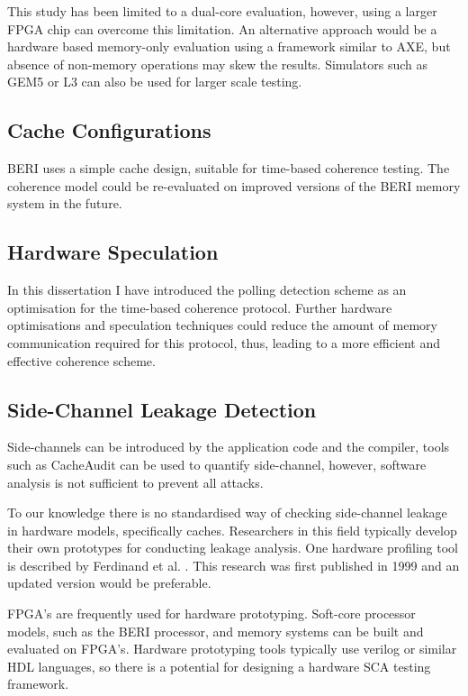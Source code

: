 			This study has been limited to a dual-core evaluation, however, using a larger FPGA chip can overcome this limitation.
			An alternative approach would be a hardware based memory-only evaluation using a framework similar to AXE, but absence of non-memory operations may skew the results.
			Simulators such as GEM5 \cite{GEM5} or L3 \cite{Fox15} can also be used for larger scale testing.
		
		\subsection{Cache Configurations}
			BERI uses a simple cache design, suitable for time-based coherence testing. The coherence model could be re-evaluated on improved versions of the BERI memory system in the future.
			
		\subsection{Hardware Speculation}
			In this dissertation I have introduced the polling detection scheme as an optimisation for the time-based coherence protocol. Further hardware optimisations and speculation techniques could reduce the amount of memory communication required for this protocol, thus, leading to a more efficient and effective coherence scheme.
			
		\subsection{Side-Channel Leakage Detection}
			Side-channels can be introduced by the application code and the compiler, tools such as CacheAudit \cite{Doychev13} can be used to quantify side-channel, however, software analysis is not sufficient to prevent all attacks.
			
			To our knowledge there is no standardised way of checking side-channel leakage in hardware models, specifically caches. Researchers in this field typically develop their own prototypes for conducting leakage analysis. One hardware profiling tool is described by Ferdinand et al. \cite{Ferdinand99}. This research was first published in 1999 and an updated version would be preferable.
			
			FPGA's are frequently used for hardware prototyping. Soft-core processor models, such as the BERI processor, and memory systems can be built and evaluated on FPGA's. Hardware prototyping tools typically use verilog or similar HDL languages, so there is a potential for designing a hardware SCA testing framework. 
			
